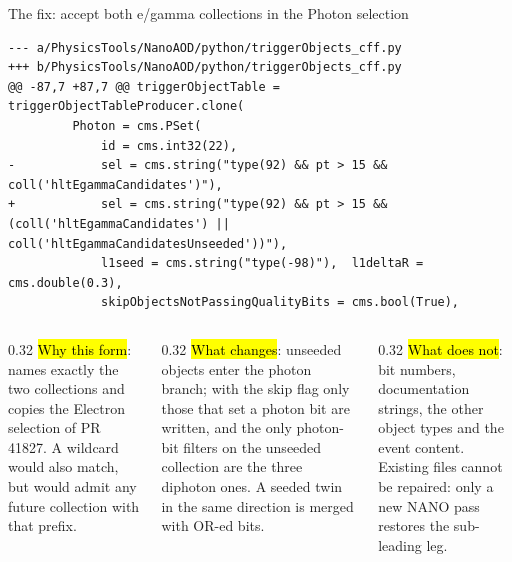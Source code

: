 
\begin{frame}[fragile]{The fix: accept both e/gamma collections in the Photon selection}
\begin{lstlisting}
--- a/PhysicsTools/NanoAOD/python/triggerObjects_cff.py
+++ b/PhysicsTools/NanoAOD/python/triggerObjects_cff.py
@@ -87,7 +87,7 @@ triggerObjectTable = triggerObjectTableProducer.clone(
         Photon = cms.PSet(
             id = cms.int32(22),
-            sel = cms.string("type(92) && pt > 15 && coll('hltEgammaCandidates')"),
+            sel = cms.string("type(92) && pt > 15 && (coll('hltEgammaCandidates') || coll('hltEgammaCandidatesUnseeded'))"),
             l1seed = cms.string("type(-98)"),  l1deltaR = cms.double(0.3),
             skipObjectsNotPassingQualityBits = cms.bool(True),
\end{lstlisting}
  \begin{columns}[T]
    \begin{column}{0.32\linewidth}
      {\scriptsize\hl{Why this form}: names exactly the two collections and copies the Electron selection of PR 41827.
      A wildcard  would also match, but would admit any future collection with
      that prefix.}
    \end{column}
    \begin{column}{0.32\linewidth}
      {\scriptsize\hl{What changes}: unseeded objects enter the photon branch; with the skip flag only those that set
      a photon bit are written, and the only photon-bit filters on the unseeded collection are the three diphoton
      ones. A seeded twin in the same direction is merged with OR-ed bits.}
    \end{column}
    \begin{column}{0.32\linewidth}
      {\scriptsize\hl{What does not}: bit numbers, documentation strings, the other object types and the event
      content. Existing files cannot be repaired: only a new NANO pass restores the sub-leading leg.}
    \end{column}
  \end{columns}
\end{frame}

